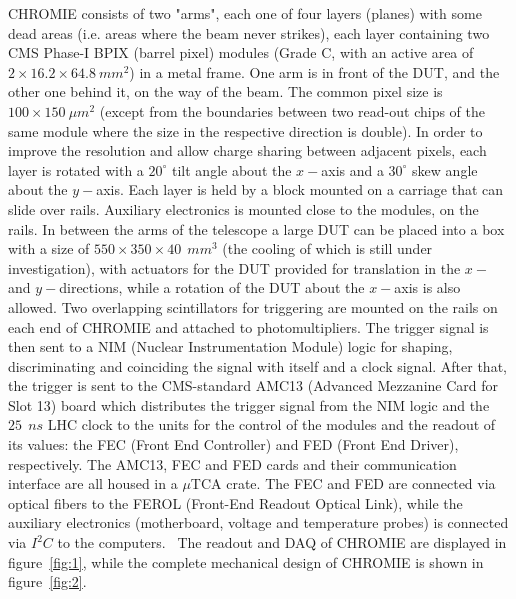 \documentclass[a4paper,11pt]{article}
\begin{document}
CHROMIE consists of two "arms", each one of four layers (planes) with some dead areas (i.e. areas where the beam never strikes), each layer containing two CMS Phase-I BPIX (barrel pixel) modules (Grade C, with an active area of $2\times 16.2 \times 64.8\: mm^2$) in a metal frame. One arm is in front of the DUT, and the other one behind it, on the way of the beam. The common pixel size is $100\times 150\: \mu m^2$ (except from the boundaries between two read-out chips of the same module where the size in the respective direction is double). In order to improve the resolution and allow charge sharing between adjacent pixels, each layer is rotated with a $20^{\circ}$ tilt angle about the $x-$axis and a $30^{\circ}$ skew angle about the $y-$axis. Each layer is held by a block mounted on a carriage that can slide over rails. Auxiliary electronics is mounted close to the modules, on the rails. In between the arms of the telescope a large DUT can be placed into a box with a size of $550 \times 350 \times 40\: \: mm^3$ (the cooling of which is still under investigation), with actuators for the DUT provided for translation in the $x-$ and $y-$directions, while a rotation of the DUT about the $x-$axis is also allowed. Two overlapping scintillators for triggering are mounted on the rails on each end of CHROMIE and attached to photomultipliers. The trigger signal is then sent to a NIM (Nuclear Instrumentation Module) logic for shaping, discriminating and coinciding the signal with itself and a clock signal. After that, the trigger is sent to the CMS-standard AMC13 (Advanced Mezzanine Card for Slot 13) board which distributes the trigger signal from the NIM logic and the $25\: \: ns$ LHC clock to the units for the control of the modules and the readout of its values: the FEC (Front End Controller) and FED (Front End Driver), respectively. The AMC13, FEC and FED cards and their communication interface are all housed in a $\mu$TCA crate. The FEC and FED are connected via optical fibers to the FEROL (Front-End Readout Optical Link), while the auxiliary electronics (motherboard, voltage and temperature probes) is connected via $I^2 C$ to the computers.~\cite{d} The readout and DAQ of CHROMIE are displayed in figure~\ref{fig:1}, while the complete mechanical design of CHROMIE is shown in figure~\ref{fig:2}.
\end{document}
